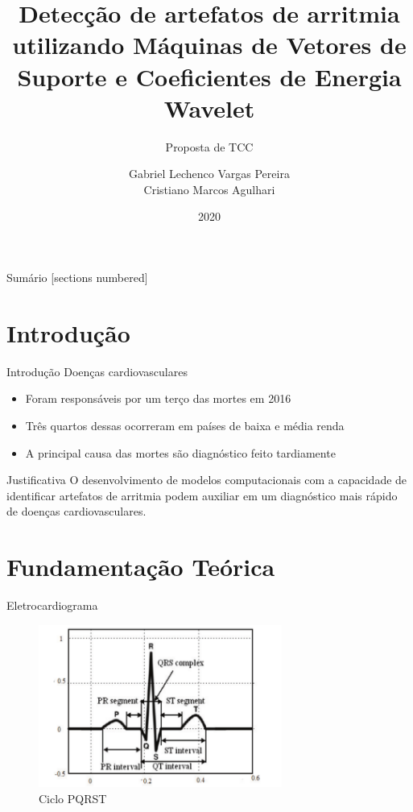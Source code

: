 \documentclass[10pt]{beamer}
\title{Detecção de artefatos de arritmia utilizando Máquinas de Vetores de Suporte e Coeficientes de Energia Wavelet}
\subtitle{Proposta de TCC}
\date{2020}
\author{Gabriel Lechenco Vargas Pereira \\
Cristiano Marcos Agulhari}
\institute{Universidade Tecnológica Federal do Paraná - UTFPR}
\begin{document}

\maketitle

\begin{frame}{Sumário}
  [sections numbered]
  \tableofcontents[hideallsubsections]
\end{frame}

\section{Introdução}

\begin{frame}{Introdução}
    Doenças cardiovasculares
    \begin{itemize}
        \item Foram responsáveis por um terço das mortes em 2016
        \item Três quartos dessas ocorreram em países de baixa e média renda
        \item A principal causa das mortes são diagnóstico feito tardiamente
    \end{itemize}
\end{frame}

\begin{frame} {Justificativa}
  O desenvolvimento de modelos computacionais com a capacidade de identificar 
  artefatos de arritmia podem auxiliar em um diagnóstico mais rápido de doenças 
  cardiovasculares.
\end{frame}

\section{Fundamentação Teórica}

\begin{frame}{Eletrocardiograma}
    \begin{figure}[]
      \centering
      \includegraphics[width=8cm]{images/pqrst.png}
      \caption{Ciclo PQRST \cite{faziludeen_ecg_2013}}
      \label{fig:pqrst}
    \end{figure}
\end{frame}
\end{document}

